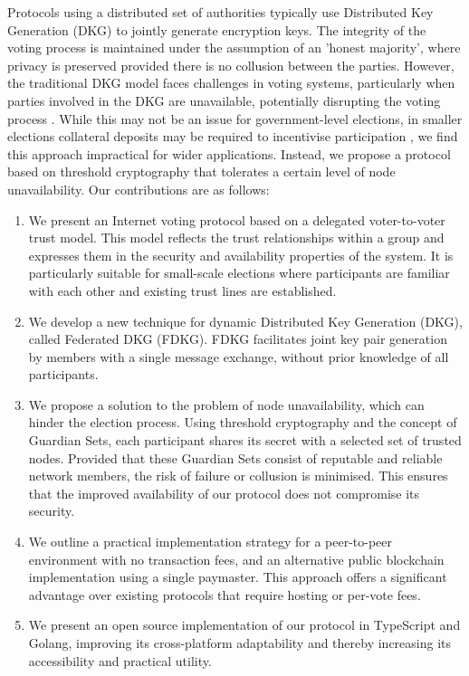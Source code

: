 \documentclass[runningheads]{llncs}
\begin{document}
Protocols using a distributed set of authorities typically use Distributed Key Generation (DKG) \cite{gennaroSecureDistributedKey1999} to jointly generate encryption keys. The integrity of the voting process is maintained under the assumption of an 'honest majority', where privacy is preserved provided there is no collusion between the parties. However, the traditional DKG model faces challenges in voting systems, particularly when parties involved in the DKG are unavailable, potentially disrupting the voting process \cite{haoAnonymousVotingTworound2010}. While this may not be an issue for government-level elections, in smaller elections collateral deposits may be required to incentivise participation \cite{elsheikhDisputefreeScalableOpen2022}, we find this approach impractical for wider applications. Instead, we propose a protocol based on threshold cryptography that tolerates a certain level of node unavailability. Our contributions are as follows:

\begin{enumerate}
    \item We present an Internet voting protocol based on a delegated voter-to-voter trust model. This model reflects the trust relationships within a group and expresses them in the security and availability properties of the system. It is particularly suitable for small-scale elections where participants are familiar with each other and existing trust lines are established.
    
    \item We develop a new technique for dynamic Distributed Key Generation (DKG), called Federated DKG (FDKG). FDKG facilitates joint key pair generation by members with a single message exchange, without prior knowledge of all participants.

    \item We propose a solution to the problem of node unavailability, which can hinder the election process. Using threshold cryptography and the concept of Guardian Sets, each participant shares its secret with a selected set of trusted nodes. Provided that these Guardian Sets consist of reputable and reliable network members, the risk of failure or collusion is minimised. This ensures that the improved availability of our protocol does not compromise its security.
    
    \item We outline a practical implementation strategy for a peer-to-peer environment with no transaction fees, and an alternative public blockchain implementation using a single paymaster. This approach offers a significant advantage over existing protocols that require hosting or per-vote fees.

    \item We present an open source implementation of our protocol in TypeScript and Golang, improving its cross-platform adaptability and thereby increasing its accessibility and practical utility.
\end{enumerate}
\end{document}
